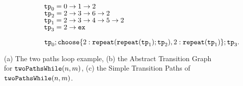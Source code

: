 {\begin{figure}
\begin{subfigure}{.71\textwidth}
{\small
\begin{subfigure}{.3\textwidth}
\begin{centering}
    $\mathtt{tp}_0 = 0 \to 1 \to 2$ \\
    $\mathtt{tp}_2 = 2 \to 3 \to 6 \to 2$ \\ 
    $\mathtt{tp}_1 = 2 \to 3 \to 4 \to 5 \to 2$ \\
    $\mathtt{tp}_3 = 2 \to \mathtt{ex}$
    \caption{}
\end{centering}
\end{subfigure}
}
{\small
\begin{subfigure}{.8\textwidth}
\begin{centering}
$
\tpath_0 ; 
\rpchoose{2: \rprepeat(\rprepeat(\tpath_1); \tpath_2), 
2: \rprepeat(\tpath_1)}; \tpath_3.
$
\end{centering}
\end{subfigure}
}
\end{subfigure}
\vspace{-0.2cm}
\caption{
(a) The two paths loop example,
(b) the Abstract Transition Graph for $\mathtt{twoPathsWhile}(n, m)$,
(c) the Simple Transition Paths of $\mathtt{twoPathsWhile}(n, m)$.}
\vspace{-0.5cm}
    \label{fig:whileTwoCounters-overview}
\end{figure}
}


